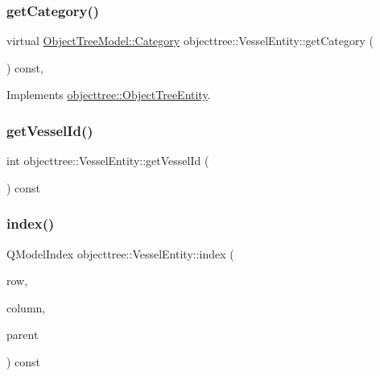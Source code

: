 \mbox{\label{classobjecttree_1_1_vessel_entity_a25fba35cee80316cd61fd530841b2123}} 
\subsubsection{\texorpdfstring{getCategory()}{getCategory()}}
{\footnotesize\ttfamily virtual \mbox{\hyperlink{class_object_tree_model_a379e9d6b0d381853785adf62095ba4e3}{Object\+Tree\+Model\+::\+Category}} objecttree\+::\+Vessel\+Entity\+::get\+Category (\begin{DoxyParamCaption}{ }\end{DoxyParamCaption}) const\hspace{0.3cm}{\ttfamily [inline]}, {\ttfamily [virtual]}}



Implements \mbox{\hyperlink{classobjecttree_1_1_object_tree_entity_aa4e80e7fa80672c1b9902add665abc77}{objecttree\+::\+Object\+Tree\+Entity}}.

\mbox{\label{classobjecttree_1_1_vessel_entity_a8e45383cb111d6edb1374f9391a07513}} 
\subsubsection{\texorpdfstring{getVesselId()}{getVesselId()}}
{\footnotesize\ttfamily int objecttree\+::\+Vessel\+Entity\+::get\+Vessel\+Id (\begin{DoxyParamCaption}{ }\end{DoxyParamCaption}) const\hspace{0.3cm}{\ttfamily [inline]}}

\mbox{\label{classobjecttree_1_1_vessel_entity_a20c7a77debdacf5dfe526c8b74557029}} 
\subsubsection{\texorpdfstring{index()}{index()}}
{\footnotesize\ttfamily Q\+Model\+Index objecttree\+::\+Vessel\+Entity\+::index (\begin{DoxyParamCaption}\item[{int}]{row,  }\item[{int}]{column,  }\item[{const Q\+Model\+Index \&}]{parent }\end{DoxyParamCaption}) const\hspace{0.3cm}{\ttfamily [virtual]}}



